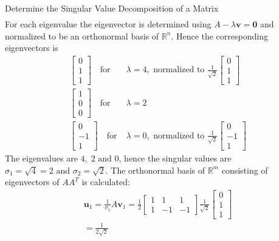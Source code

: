 \begin{example}{Determine the Singular Value Decomposition of a Matrix}
\begin{align*}
    \end{align*}
    For each eigenvalue the eigenvector is determined using $A-\lambda \mathbf{v}=\mathbf{0}$ and normalized to be an orthonormal basis of $\mathbb{R}^n$. Hence the corresponding eigenvectors is
    \begin{align*}
        \begin{bmatrix}
            0\\1\\1
        \end{bmatrix} \quad \text{for}\;& \lambda=4, \text{ normalized to  }\frac{1}{\sqrt{2}}
        \begin{bmatrix}
            0\\1\\1
        \end{bmatrix}\\
        \begin{bmatrix}
            1\\0\\0
        \end{bmatrix} \quad \text{for}\; &\lambda=2\\
        \begin{bmatrix}
            0\\-1\\1
        \end{bmatrix} \quad \text{for}\;&\lambda=0, \text{ normalized to } \frac{1}{\sqrt{2}}
        \begin{bmatrix}
            0\\-1\\1
        \end{bmatrix}
    \end{align*}
    The eigenvalues are $4,\;2 \text{ and }0$, hence the singular values are $\sigma_1 = \sqrt{4}=2\text{ and }\sigma_2 = \sqrt{2}$. The orthonormal basis of $\mathbb{R}^m$ consisting of eigenvectors of $AA^T$ is calculated:
\begin{align*}
    \mathbf{u}_1 = \frac{1}{\sigma_1}A \mathbf{v}_1 = \frac{1}{2}
    \begin{bmatrix}
       1 & 1 & 1\\
       1 & -1 & -1
    \end{bmatrix}
    \frac{1}{\sqrt{2}}
        \begin{bmatrix}
            0\\1\\1
        \end{bmatrix}\\
    = \frac{1}{2\sqrt{2}}

\end{align*}
\end{example}
